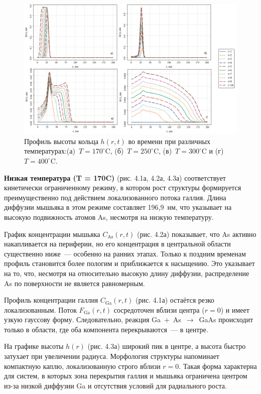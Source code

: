 \documentclass[14pt,oneside]{extarticle}
\begin{document}
\begin{figure}
    \begin{center}
    \includegraphics[width=18cm]{images/h-t.png}
    \caption{\label{fig:h_t} Профиль высоты кольца $h(r, t)$ во времени при различных температурах:(а)~$T = 170^\circ$C, (б)~$T = 250^\circ$C, (в)~$T = 300^\circ$C и (г)~$T = 400^\circ$C.}
    \end{center}
\end{figure}

\textbf{Низкая температура (T = 170\textdegree C)} (рис. 4.1а, 4.2а, 4.3а) соответствует кинетически ограниченному режиму, в котором рост структуры формируется преимущественно под действием локализованного потока галлия. Длина диффузии мышьяка в этом режиме составляет 196{,}9~нм, что указывает на высокую подвижность атомов As, несмотря на низкую температуру.

График концентрации мышьяка $C_\mathrm{As}(r, t)$ (рис. 4.2а) показывает, что As активно накапливается на периферии, но его концентрация в центральной области существенно ниже~— особенно на ранних этапах. Только к поздним временам профиль становится более пологим и приближается к насыщению. Это указывает на то, что, несмотря на относительно высокую длину диффузии, распределение As по поверхности не является равномерным.

Профиль концентрации галлия $C_\mathrm{Ga}(r, t)$ (рис. 4.1а) остаётся резко локализованным. Поток $F_\mathrm{Ga}(r, t)$ сосредоточен вблизи центра ($r = 0$) и имеет узкую гауссову форму. Следовательно, реакция Ga~+~As~$\rightarrow$~GaAs происходит только в области, где оба компонента перекрываются~— в центре.

На графике высоты $h(r)$ (рис. 4.3а) широкий пик в центре, а высота быстро затухает при увеличении радиуса. Морфология структуры напоминает компактную каплю, локализованную строго вблизи $r = 0$. Такая форма характерна для систем, в которых зона перекрытия галлия и мышьяка ограничена центром из-за низкой диффузии Ga и отсутствия условий для радиального роста.
\end{document}
